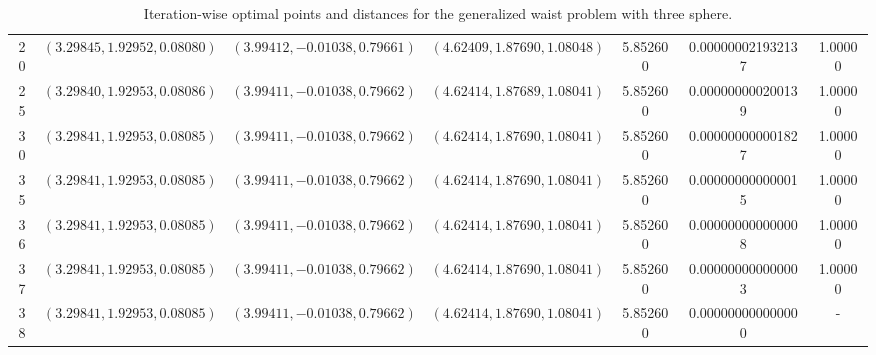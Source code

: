 \documentclass[12pt]{article}
\theoremstyle{plain}
\theoremstyle{definition}
\begin{document}
\begin{table}[H]
\begin{sideways}
\begin{tabular}{|c|c|c|c|c|c|c|}
			20 & $(3.29845, 1.92952, 0.08080)$ & $(3.99412, -0.01038, 0.79661)$ & $(4.62409, 1.87690, 1.08048)$ & 5.852600 & 0.000000021932137 & 1.00000 \\ 
			
			25 & $(3.29840, 1.92953, 0.08086)$ & $(3.99411, -0.01038, 0.79662)$ & $(4.62414, 1.87689, 1.08041)$ & 5.852600 & 0.000000000200139 & 1.00000 \\ 
			
			30 & $(3.29841, 1.92953, 0.08085)$ & $(3.99411, -0.01038, 0.79662)$ & $(4.62414, 1.87690, 1.08041)$ & 5.852600 & 0.000000000001827 & 1.00000 \\ 
			
			35 & $(3.29841, 1.92953, 0.08085)$ & $(3.99411, -0.01038, 0.79662)$ & $(4.62414, 1.87690, 1.08041)$ & 5.852600 & 0.000000000000015 & 1.00000 \\ 
			36 & $(3.29841, 1.92953, 0.08085)$ & $(3.99411, -0.01038, 0.79662)$ & $(4.62414, 1.87690, 1.08041)$ & 5.852600 & 0.000000000000008 & 1.00000 \\ 
			37 & $(3.29841, 1.92953, 0.08085)$ & $(3.99411, -0.01038, 0.79662)$ & $(4.62414, 1.87690, 1.08041)$ & 5.852600 & 0.000000000000003 & 1.00000 \\ 
			38 & $(3.29841, 1.92953, 0.08085 )$ & $(3.99411, -0.01038, 0.79662 )$ & $(4.62414, 1.87690, 1.08041 )$ & 5.852600  & 0.000000000000000 & - \\ 
			\hline
		\end{tabular}
		
	\end{sideways}
	\caption{Iteration-wise optimal points and distances for the generalized waist problem with three sphere.}
	\label{tab:example2_iteration_data}
\end{table}
\end{document}
